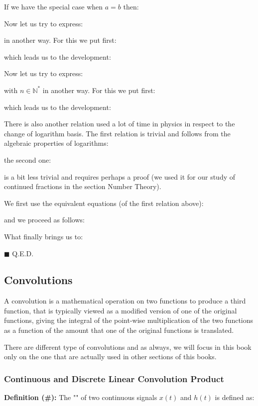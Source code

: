 	If we have the special case when $a=b$ then:
	
	Now let us try to express:
	
	in another way. For this we put first:
	
	which leads us to the development:
	
	Now let us try to express:
	
	with $n\in \mathbb{N}^{*}$ in another way. For this we put first:
	
	which leads us to the development:
	
	There is  also another relation used a lot of time in physics in respect to the change of logarithm basis. The first relation is trivial and follows from the algebraic properties of logarithms:
	
	the second one:
	
	is a bit less trivial and requires perhaps a proof (we used it for our study of continued fractions in the section Number Theory).
	\begin{dem}
	We first use the equivalent equations (of the first relation above):
	
	and we proceed as follows:
	
	What finally brings us to:
	
	\begin{flushright}
		$\blacksquare$  Q.E.D.
	\end{flushright}
	\end{dem}
	
	\pagebreak
	\subsection{Convolutions}\label{convolution}
	A convolution is a mathematical operation on two functions to produce a third function, that is typically viewed as a modified version of one of the original functions, giving the integral of the point-wise multiplication of the two functions as a function of the amount that one of the original functions is translated.
	
	There are different type of convolutions and as always, we will focus in this book only on the one that are actually used in other sections of this books.
	
	\subsubsection{Continuous and Discrete Linear Convolution Product}
	\textbf{Definition (\#\mydef):} The "\label{continuous convolution}" of two continuous signals $x(t)$ and $h(t)$ is defined as:
	
